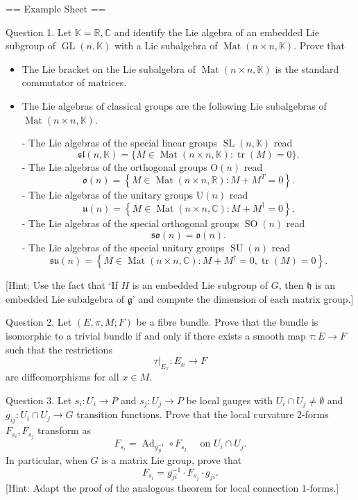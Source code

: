 == Example Sheet ==

\qquad Question 1. Let $\mathbb{K}=\mathbb{R}, \mathbb{C}$ and identify the Lie algebra of an embedded Lie subgroup of $\operatorname{GL}(n, \mathbb{K})$ with a Lie subalgebra of $\operatorname{Mat}(n \times n, \mathbb{K})$. Prove that
\begin{itemize}
\item The Lie bracket on the Lie subalgebra of $\operatorname{Mat}(n \times n, \mathbb{K})$ is the standard commutator of matrices.
\item The Lie algebras of classical groups are the following Lie subalgebras of $\operatorname{Mat}(n \times n, \mathbb{K})$.

- The Lie algebras of the special linear groups $\operatorname{SL}(n, \mathbb{K})$ read
\[\mathfrak{sl}(n, \mathbb{K})=\{M \in \operatorname{Mat}(n \times n, \mathbb{K}): \operatorname{tr}(M)=0\}.\]
- The Lie algebras of the orthogonal groups $\mathrm{O}(n)$ read
\[\mathfrak{o}(n)=\left\{M \in \operatorname{Mat}(n \times n, \mathbb{R}): M+M^T=0\right\}.\]
- The Lie algebras of the unitary groups $\mathrm{U}(n)$ read
\[\mathfrak{u}(n)=\left\{M \in \operatorname{Mat}(n \times n, \mathbb{C}): M+M^{\dagger}=0\right\}.\]
- The Lie algebras of the special orthogonal groups $\operatorname{SO}(n)$ read
\[\mathfrak{so}(n)=\mathfrak{o}(n).\]
- The Lie algebras of the special unitary groups $\operatorname{SU}(n)$ read
\[\mathfrak{su}(n)=\left\{M \in \operatorname{Mat}(n \times n, \mathbb{C}): M+M^{\dagger}=0, \operatorname{tr}(M)=0\right\}.\]
\end{itemize}
[Hint: Use the fact that `If $H$ is an embedded Lie subgroup of $G$, then $\mathfrak{h}$ is an embedded Lie subalgebra of $\mathfrak{g}$' and compute the dimension of each matrix group.]

\qquad Question 2. Let $(E, \pi, M ; F)$ be a fibre bundle. Prove that the bundle is isomorphic to a trivial bundle if and only if there exists a smooth map $\tau: E \rightarrow F$ such that the restrictions
\[\tau|_{E_x}: E_x \longrightarrow F\]
are diffeomorphisms for all $x \in M$.

\qquad Question 3. Let $s_i: U_i \rightarrow P$ and $s_j: U_j \rightarrow P$ be local gauges with $U_i \cap U_j \neq \emptyset$ and $g_{i j}: U_i \cap U_j \rightarrow G$ transition functions. 
Prove that the local curvature $2$-forms $F_{s_i}, F_{s_j}$ transform as
\[F_{s_i}=\operatorname{Ad}_{g_{ji}^{-1}} \circ F_{s_j} \quad \text { on } U_i \cap U_j.\]
In particular, when $G$ is a matrix Lie group, prove that
\[F_{s_i}=g_{ji}^{-1} \cdot F_{s_j} \cdot g_{ji}.\]
[Hint: Adapt the proof of the analogous theorem for local connection $1$-forms.]

